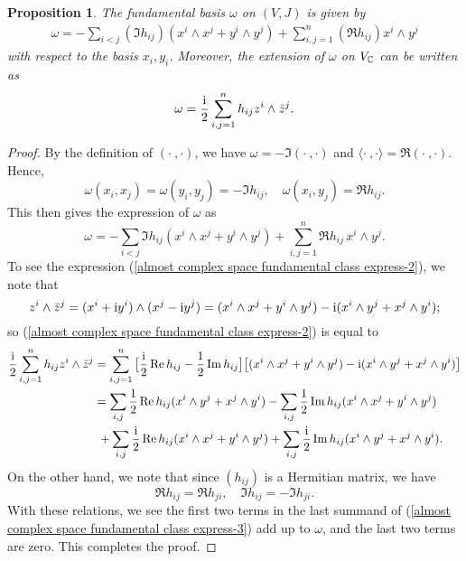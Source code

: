 \documentclass[11pt]{book}
\newtheorem{proposition}[theorem]{Proposition}
\theoremstyle{definition}
\begin{document}
\begin{proposition}\label{almost complex space fundamental class express}
The fundamental basis $\omega$ on $(V,J)$ is given by
\begin{align}\label{almost complex space fundamental class express-1}
\omega=-\sum_{i<j}(\Im h_{ij})(x^i\wedge x^j+y^i\wedge y^j)+\sum_{i,j=1}^{n}(\Re h_{ij})x^i\wedge y^j
\end{align}
with respect to the basis $x_i,y_i$. Moreover, the extension of $\omega$ on $V_{\mathbb{C}}$ can be written as
\begin{align}\label{almost complex space fundamental class express-2}
\omega=\frac{\mathrm{i}}{2}\sum_{i,j=1}^{n}h_{ij}z^i\wedge\bar{z}^j.
\end{align}
\end{proposition}
\begin{proof}
By the definition of $(\cdot\ ,\cdot)$, we have $\omega=-\Im(\cdot\ ,\cdot)$ and $\langle\cdot\ ,\cdot\rangle=\Re(\cdot\ ,\cdot)$. Hence,
\[\omega(x_i,x_j)=\omega(y_i,y_j)=-\Im h_{ij},\quad \omega(x_i,y_j)=\Re h_{ij}.\]
This then gives the expression of $\omega$ as
\[\omega=-\sum_{i<j}\Im h_{ij}(x^i\wedge x^j+y^i\wedge y^j)+\sum_{i,j=1}^{n}\Re h_{ij}\,x^i\wedge y^j.\]
To see the expression (\ref{almost complex space fundamental class express-2}), we note that
\[z^i\wedge\bar{z}^j=(x^i+\mathrm{i} y^i)\wedge(x^j-\mathrm{i} y^j)=(x^i\wedge x^j+y^i\wedge y^j)-\mathrm{i}(x^i\wedge y^j+x^j\wedge y^i);\]
so (\ref{almost complex space fundamental class express-2}) is equal to
\begin{equation}\label{almost complex space fundamental class express-3}
\begin{aligned}
\frac{\mathrm{i}}{2}\sum_{i,j=1}^{n}h_{ij}z^i\wedge\bar{z}^j&=\sum_{i,j=1}^{n}\big[\frac{\mathrm{i}}{2}\operatorname{Re} h_{ij}-\frac{1}{2}\operatorname{Im} h_{ij}\big]\big[(x^i\wedge x^j+y^i\wedge y^j)-\mathrm{i}(x^i\wedge y^j+x^j\wedge y^i)\big]\\
&=\sum_{i,j}\frac{1}{2}\operatorname{Re} h_{ij}(x^i\wedge y^j+x^j\wedge y^i)-\sum_{i,j}\frac{1}{2}\operatorname{Im} h_{ij}(x^i\wedge x^j+y^i\wedge y^j)\\
&\ +\sum_{i,j}\frac{\mathrm{i}}{2}\operatorname{Re} h_{ij}(x^i\wedge x^j+y^i\wedge y^j)+\sum_{i,j}\frac{\mathrm{i}}{2}\operatorname{Im} h_{ij}(x^i\wedge y^j+x^j\wedge y^i).
\end{aligned}
\end{equation}
On the other hand, we note that since $(h_{ij})$ is a Hermitian matrix, we have
\[\Re h_{ij}=\Re h_{ji},\quad \Im h_{ij}=-\Im h_{ji}.\]
With these relations, we see the first two terms in the last summand of (\ref{almost complex space fundamental class express-3}) add up to $\omega$, and the last two terms are zero. This completes the proof.
\end{proof}
\end{document}
